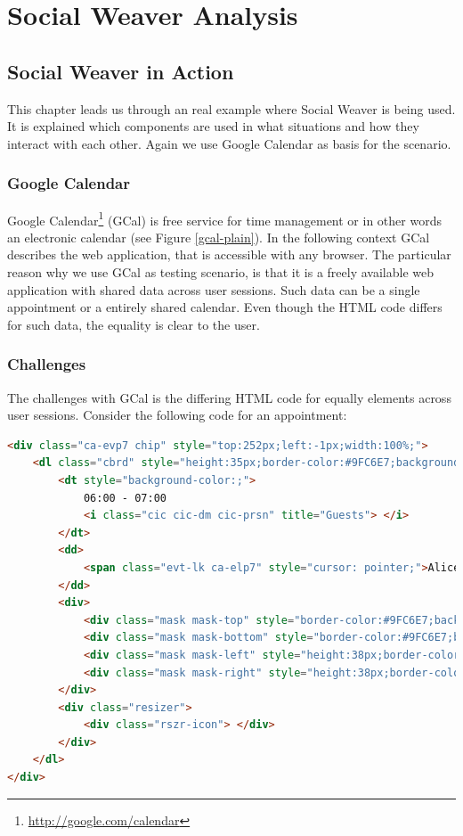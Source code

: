 \section{Social Weaver Analysis}
\subsection{Social Weaver in Action}
This chapter leads us through an real example where Social Weaver is being used. It is explained which components are used in what situations and how they interact with each other. Again we use Google Calendar as basis for the scenario.

\subsubsection{Google Calendar}
Google Calendar\footnote{\url{http://google.com/calendar}} (GCal) is free service for time management or in other words an electronic calendar (see Figure \ref{gcal-plain}). In the following context GCal describes the web application, that is accessible with any browser. The particular reason why we use GCal as testing scenario, is that it is a freely available web application with shared data across user sessions. Such data can be a single appointment or a entirely shared calendar. Even though the HTML code differs for such data, the equality is clear to the user.

\subsubsection{Challenges}
The challenges with GCal is the differing HTML code for equally elements across user sessions. Consider the following code for an appointment:

\begin{lstlisting}[language=HTML]
<div class="ca-evp7 chip" style="top:252px;left:-1px;width:100%;">
	<dl class="cbrd" style="height:35px;border-color:#9FC6E7;background-color:#E4EFF8;color:#777777;">
		<dt style="background-color:;">
			06:00 - 07:00
			<i class="cic cic-dm cic-prsn" title="Guests"> </i>
		</dt>
		<dd>
			<span class="evt-lk ca-elp7" style="cursor: pointer;">Alice and Bob Meeting</span>
		</dd>
		<div>
			<div class="mask mask-top" style="border-color:#9FC6E7;background-color:#E4EFF8;"> </div>
			<div class="mask mask-bottom" style="border-color:#9FC6E7;background-color:#E4EFF8;"> </div>
			<div class="mask mask-left" style="height:38px;border-color:#9FC6E7;background-color:#E4EFF8;"> </div>
			<div class="mask mask-right" style="height:38px;border-color:#9FC6E7;background-color:#E4EFF8;"> </div>
		</div>
		<div class="resizer">
			<div class="rszr-icon"> </div>
		</div>
	</dl>
</div>
\end{lstlisting}

